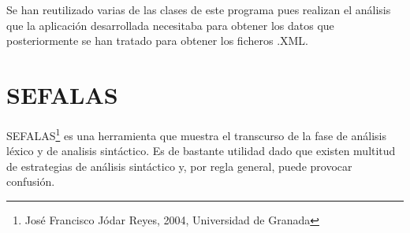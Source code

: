 Se han reutilizado varias de las clases de este programa pues realizan el análisis que la aplicación desarrollada necesitaba para obtener los datos que posteriormente se han tratado para obtener los ficheros .XML.


\section{SEFALAS}

SEFALAS\footnote{José Francisco Jódar Reyes, 2004, Universidad de Granada} es una herramienta que muestra el transcurso de la fase de análisis léxico y de analisis sintáctico. Es de bastante utilidad dado que existen multitud de estrategias de análisis sintáctico y, por regla general, puede provocar confusión.


